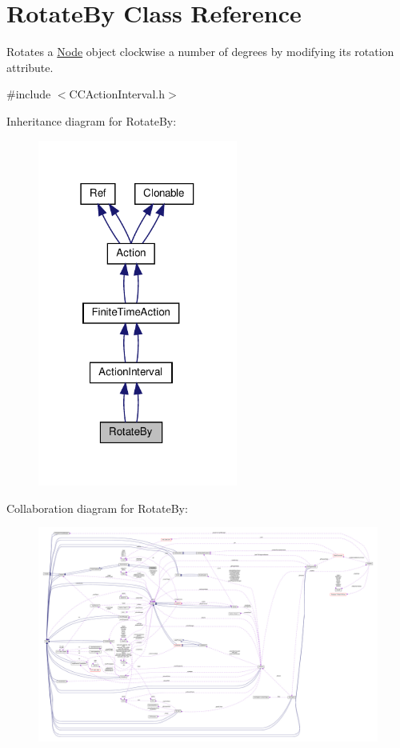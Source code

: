 \hypertarget{classRotateBy}{}\section{Rotate\+By Class Reference}
\label{classRotateBy}


Rotates a \hyperlink{classNode}{Node} object clockwise a number of degrees by modifying it\textquotesingle{}s rotation attribute.  




{\ttfamily \#include $<$C\+C\+Action\+Interval.\+h$>$}



Inheritance diagram for Rotate\+By\+:
\nopagebreak
\begin{figure}[H]
\begin{center}
\leavevmode
\includegraphics[width=186pt]{classRotateBy__inherit__graph}
\end{center}
\end{figure}


Collaboration diagram for Rotate\+By\+:
\nopagebreak
\begin{figure}[H]
\begin{center}
\leavevmode
\includegraphics[width=350pt]{classRotateBy__coll__graph}
\end{center}
\end{figure}
